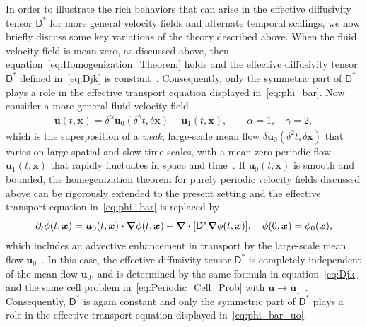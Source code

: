 \documentclass[leqno,onefignum,onetabnum]{siamltex1213}
\newcommand{\Dm}{\mathsf{D}}
\newcommand\bnabla{\mbox{\boldmath${\nabla}$}}
\providecommand\bcdot{\boldsymbol{\cdot}}
\newcommand{\vecx}{\boldsymbol{x}}
\newcommand{\vecu}{\boldsymbol{u}}
\newcommand{\vecxi}{\boldsymbol{\xi}}
\begin{document}
In order to illustrate the rich behaviors that can arise in the effective
diffusivity tensor $\Dm^*$ for more general velocity fields and
alternate temporal scalings, we now briefly discuss some key variations
of the theory described above. When the 
fluid velocity field is mean-zero, as discussed above, then
equation~\eqref{eq:Homogenization_Theorem} holds and the effective
diffusivity tensor $\Dm^*$ defined in~\eqref{eq:Djk} is
constant~\cite{Majda:Kramer:1999:book}. Consequently, only the
symmetric part of $\Dm^*$ plays a role in the effective transport
equation displayed in~\eqref{eq:phi_bar}. Now consider a more general
fluid velocity field
%
\begin{align}\label{eq:Velocity_field_uo_u1}
  \vecu(t,\vecx)=\delta^\alpha\vecu_0(\delta^\gamma t,\delta\vecx)+\vecu_1(t,\vecx),
  \qquad
  \alpha=1, \quad
  \gamma=2,
\end{align}
%
which is the superposition of a \emph{weak}, large-scale mean flow
$\delta\vecu_0(\delta^2t,\delta\vecx)$ that varies on large spatial and slow time
scales, with a mean-zero periodic flow $\vecu_1(t,\vecx)$ that rapidly
fluctuates in space and time~\cite{Majda:Kramer:1999:book}.
If $\vecu_0(t,\vecx)$ is smooth and bounded, the homegenization
theorem for purely periodic velocity fields discussed above can be
rigorously extended to the present setting and the effective transport
equation in~\eqref{eq:phi_bar} is replaced
by~\cite{Majda:Kramer:1999:book}   
%
\begin{align}\label{eq:phi_bar_uo}
  \partial_t\bar{\phi}(t,\vecx)=\vecu_0(t,\vecx)\bcdot\bnabla\bar{\phi}(t,\vecx)
                   +\bnabla\bcdot[\Dm^*\bnabla\bar{\phi}(t,\vecx)],
  \quad 
  \bar{\phi}(0,\vecx)=\phi_0(\vecx),
\end{align}
%
which includes an advective enhancement in transport by the
large-scale mean flow $\vecu_0$~\cite{Majda:Kramer:1999:book}. In this
case, the effective diffusivity tensor $\Dm^*$ is completely
independent of the mean flow $\vecu_0$, and is determined by the same
formula in equation~\eqref{eq:Djk} and the same cell problem
in~\eqref{eq:Periodic_Cell_Prob} with
$\vecu\to\vecu_1$~\cite{Majda:Kramer:1999:book}. Consequently, $\Dm^*$
is again constant and only the symmetric part of $\Dm^*$ plays
a role in the effective transport equation displayed
in~\eqref{eq:phi_bar_uo}.
\end{document}
